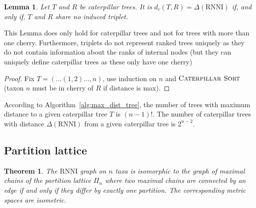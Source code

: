 \documentclass{amsart}
\newcommand{\rnni}{\mathrm{RNNI}}
\newcommand{\csort}{\textsc{Caterpillar Sort}}
\newtheorem{theorem}[definition]{Theorem}
\newtheorem{lemma}[definition]{Lemma}
\begin{document}
\begin{lemma}
    Let $T$ and $R$ be caterpillar trees.
    It is $d_c(T,R) = \Delta(\rnni)$ if, and only if, $T$ and $R$ share no induced triplet.
\end{lemma}

This Lemma does only hold for caterpillar trees and not for trees with more than one cherry.
Furthermore, triplets do not represent ranked trees uniquely as they do not contain information about the ranks of internal nodes (but they can uniquely define caterpillar trees as these only have one cherry)

\begin{proof}
    Fix $T = (\ldots(1,2) \ldots ,n)$, use induction on $n$ and $\csort$ (taxon $n$ must be in cherry of $R$ if distance is max).
\end{proof}

According to Algorithm~\ref{alg:max_dist_tree}, the number of trees with maximum distance to a given caterpillar tree $T$ is $(n-1)!$.
The number of caterpillar trees with distance $\Delta(\rnni)$ from a given caterpillar tree is $2^{n-2}$.


\subsection{Partition lattice}


\begin{theorem}
The $\rnni$ graph on $n$ taxa is isomorphic to the graph of maximal chains of the partition lattice $\Pi_n$ where two maximal chains are connected by an edge if and only if they differ by exactly one partition.
The corresponding metric spaces are isometric.
\end{theorem}


\printbibliography
\end{document}
